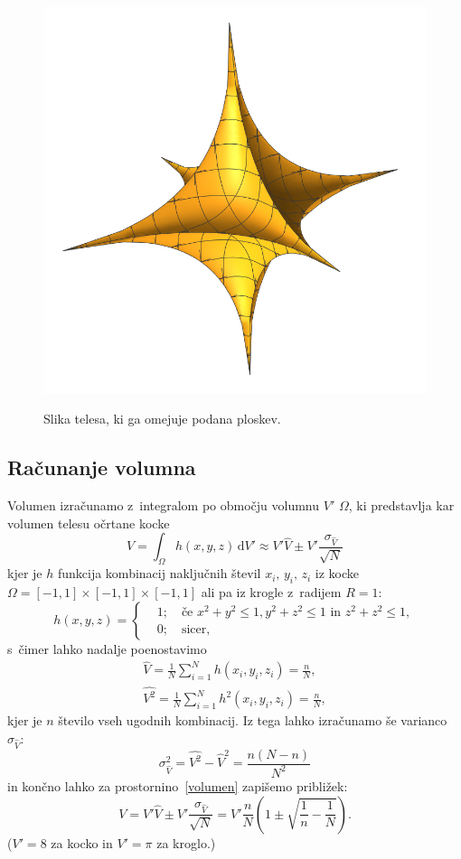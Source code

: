 \documentclass[a4paper,pdftex,10pt]{article}
\numberwithin{figure}{section} %
\begin{document}
\begin{figure}[!]
    \centering
	\includegraphics[width=.5\linewidth]{zvezda}
	\label{zvezda}
    \caption{Slika telesa, ki ga omejuje podana ploskev.}
\end{figure}

\subsection{Računanje volumna}
Volumen izračunamo z~integralom po območju volumnu $V'$ $\Omega$, ki predstavlja kar
volumen telesu očrtane kocke
\begin{equation} \label{volumen}
    V = \int_{\Omega} \!h(x,y,z) \,\text{d}V' \approx V' \hat{V} \pm V' 
    \frac{\sigma_{\hat{V}}}{\sqrt{N}}
\end{equation}
kjer je $h$ funkcija kombinacij naključnih števil $x_i, \, y_i, \, z_i$ iz kocke 
$ \Omega = [-1,1] \times [-1,1] \times [-1,1]$ ali pa iz krogle z~radijem $R=1$:
\begin{equation}
    h(x,y,z) = \left\{
	\begin{split}
	    &1; \quad \text{če } x^2 + y^2 \leq 1, y^2+z^2 \leq 1 \text{ in }
	    z^2+z^2 \leq 1 , \\
	    &0; \quad \text{sicer},
	\end{split}
    \right.
\end{equation}
s~čimer lahko nadalje poenostavimo
\begin{align}
    \hat{V} = \frac{1}{N} \sum_{i=1}^{N} h(x_i,y_i,z_i) = \frac{n}{N}, \\
    \hat{V^2} = \frac{1}{N} \sum_{i=1}^{N} h^2(x_i,y_i,z_i) = \frac{n}{N},
\end{align}
kjer je $n$ število vseh ugodnih kombinacij. Iz tega lahko izračunamo še varianco 
$\sigma_{\hat{V}}$:
\begin{equation}
    \sigma_{\hat{V}}^2 = \hat{V^2} - \hat{V}^2 = \frac{n(N-n)}{N^2}
\end{equation}
in končno lahko za prostornino~\ref{volumen} zapišemo približek:
\begin{equation} \label{prostornina}
    V = V' \hat{V} \pm V' \frac{\sigma_{\hat{V}}}{\sqrt{N}} = 
    V' \frac{n}{N} \left(1  \pm \sqrt{\frac{1}{n} - \frac{1}{N}} \right).
\end{equation}
($V'=8$ za kocko in $V'=\pi$ za kroglo.)
\end{document}
